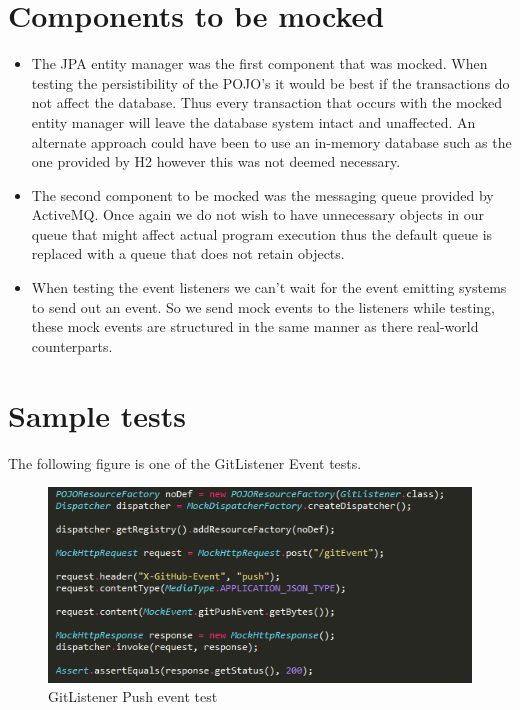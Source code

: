 \documentclass[11pt,a4paper]{article}
\begin{document}
\section{Components to be mocked}
\begin{itemize}
	\item The JPA entity manager was the first component that was mocked. When testing the persistibility of the POJO's it would be best if the transactions do not affect the database. Thus every transaction that occurs with the mocked entity manager will leave the database system intact and unaffected. An alternate approach could have been to use an in-memory database such as the one provided by H2 however this was not deemed necessary. \\
	
	\item The second component to be mocked was the messaging queue provided by ActiveMQ. Once again we do not wish to have unnecessary objects in our queue that might affect actual program execution thus the default queue is replaced with a queue that does not retain objects. \\
	
	\item When testing the event listeners we can't wait for the event emitting systems to send out an event. So we send mock events to the listeners while testing, these mock events are structured in the same manner as there real-world counterparts.
\end{itemize}

\section{Sample tests}
The following figure is one of the GitListener Event tests.

\begin{figure}[H]
	\begin{center}
		\includegraphics[scale=1.0]{../Images/sample1.png}
		\caption{GitListener Push event test}
	\end{center}
\end{figure}
\end{document}
